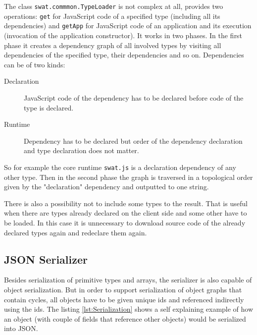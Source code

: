 \documentclass[12pt,a4paper]{report}
\begin{document}
The class \texttt{swat.commmon.TypeLoader} is not complex at all, provides two operations: \texttt{get} for JavaScript code of a specified type (including all its dependencies) and \texttt{getApp} for JavaScript code of an application and its execution (invocation of the application constructor). It works in two phases. In the first phase it creates a dependency graph of all involved types by visiting all dependencies of the specified type, their dependencies and so on. Dependencies can be of two kinds:

\begin{description}
\item[Declaration] JavaScript code of the dependency has to be declared before code of the type is declared.
\item[Runtime] Dependency has to be declared but order of the dependency declaration and type declaration does not matter.
\end{description}

So for example the core runtime \texttt{swat.js} is a declaration dependency of any other type. Then in the second phase the graph is traversed in a topological order given by the "declaration" dependency and outputted to one string. 

There is also a possibility not to include some types to the result. That is useful when there are types already declared on the client side and some other have to be loaded. In this case it is unnecessary to download source code of the already declared types again and redeclare them again.

\subsection{JSON Serializer}

Besides serialization of primitive types and arrays, the serializer is also capable of object serialization. But in order to support serialization of object graphs that contain cycles, all objects have to be given unique ids and referenced indirectly using the ids. The listing \ref{lst:Serialization} shows a self explaining example of how an object (with couple of fields that reference other objects) would be serialized into JSON. 
\end{document}
